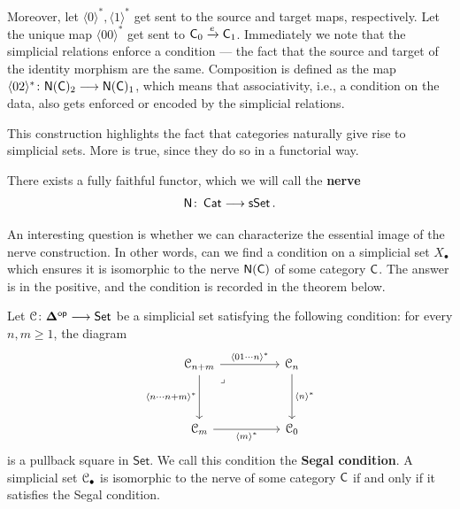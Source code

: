 Moreover, let $\langle 0\rangle^{*},\langle 1\rangle^{*}$ get sent to the source and target maps, respectively. Let the unique map $\langle 00 \rangle^{*}$ get sent to $\mathsf C_{0} \xrightarrow{e} \mathsf C_{1}$. Immediately we note that the simplicial relations enforce a condition — the fact that the source and target of the identity morphism are the same. Composition is defined as the map $\langle 02 \rangle^{*}\colon \mathsf N(\mathsf C)_{2} \longrightarrow \mathsf N(\mathsf C)_{1}$, which means that associativity, i.e., a condition on the data, also gets enforced or encoded by the simplicial relations. 

This construction highlights the fact that categories naturally give rise to simplicial sets. More is true, since they do so in a functorial way.

\begin{proposition} \label{ch2:: prop: nerve}
    There exists a fully faithful functor, which we will call the \textbf{nerve}
    \begin{equation}
        \mathsf N \colon \operatorname{{\sf Cat}} \longrightarrow \operatorname{\sf sSet}.
    \end{equation}
\end{proposition}

An interesting question is whether we can characterize the essential image of the nerve construction. In other words, can we find a condition on a simplicial set $X_\bullet$ which ensures it is isomorphic to the nerve $\mathsf N(\mathsf C)$ of some category $\mathsf C$. The answer is in the positive, and the condition is recorded in the theorem below.
\begin{theorem}\label{ch2:: thm: Kan--quillen}
    Let $\mathcal C\colon \mathbf\Delta^{\mathsf{op}} \longrightarrow \operatorname{{\mathsf{Set}}}$ be a simplicial set satisfying the following condition: for every $n,m\geq 1$, the diagram
    \begin{equation}
        \begin{tikzcd}
            {\cC_{n+m}} && {\cC_{n}} \\
            \\
            {\cC_{m}} && {\cC_{0}}
            \arrow["{\langle 01\cdots n \rangle^{*} }", from=1-1, to=1-3]
            \arrow["{\langle n\cdots n+m\rangle^{*}}"', from=1-1, to=3-1]
            \arrow["\lrcorner"{anchor=center, pos=0.125}, draw=none, from=1-1, to=3-3]
            \arrow["{\langle n\rangle^{*}}", from=1-3, to=3-3]
            \arrow["{\langle m \rangle^{*}}"', from=3-1, to=3-3]
        \end{tikzcd}
    \end{equation}
    is a pullback square in $\mathsf{Set}$. We call this condition the \textbf{Segal condition}. A simplicial set $\mathcal C_\bullet$ is isomorphic to the nerve of some category $\mathsf C$ if and only if it satisfies the Segal condition.
\end{theorem}


